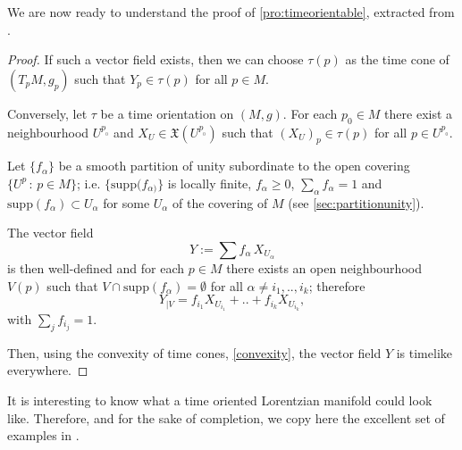 We are now ready to understand the proof of \autoref{pro:timeorientable}, extracted from \cite[p. 201]{romero10}.

\begin{proof}
	If such a vector field exists, then we can choose $\tau(p)$ as the time cone of $(T_pM,g_p)$ such that $Y_p\in \tau(p)$ for all $p\in M$.
	
	Conversely, let $\tau$ be a time orientation on $(M,g)$. For each $p_0 \in M$ there exist a neighbourhood $U^{p_{_0}}$ and $X_U\in \mathfrak{X}(U^{p_{_0}})$ such that $(X_U)_p \in \tau(p)$ for all $p\in U^{p_{_0}}$.
	
	Let $\{f_{\alpha}\}$ be a smooth partition of unity subordinate to the open covering $\{U^p\, : \, p\in M\}$; i.e. $\{\mathrm{supp}(f_{\alpha)}\}$ is locally finite, $f_{\alpha}\geq 0$, $\sum_{\alpha} f_{\alpha}=1$ and $\mathrm{supp}(f_{\alpha}) \subset U_{\alpha}$ for some $U_{\alpha}$ of the covering of $M$ (see \autoref{sec:partitionunity}).
	
	The vector field 
	\[
	Y:=\sum f_{\alpha}\, X_{U_{\alpha}}
	\] 
	is then well-defined and for each $p\in M$ there exists an open neighbourhood $V(p)$ such that $V \cap \mathrm{supp}(f_{\alpha}) = \emptyset$ for all $\alpha \neq i_1,..,i_k$; therefore
	\[
	Y_{\mid V}=f_{i_1}X_{U_{i_1}}+..+f_{i_k}X_{U_{i_k}},
	\]
	with $\sum_j f_{i_j}=1$.
	
	Then, using the convexity of time cones, \autoref{convexity}, the vector field $Y$ is timelike everywhere.
\end{proof}

It is interesting to know what a time oriented Lorentzian manifold could look like. Therefore, and for the sake of completion, we copy here the excellent set of examples in \cite[Example 3.2]{romero10}.

